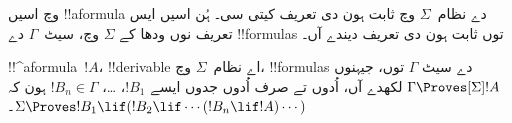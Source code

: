 \documentclass[../../../include/open-logic-section]{subfiles}
\begin{document}


 وچ اسیں !!a{formula} دے نظام~$\Sigma$ وچ ثابت ہون دی تعریف کیتی سی۔ ہُن اسیں ایس تعریف نوں ودھا کے $\Sigma$ وچ، سیٹ~$\Gamma$ دے !!{formula}s توں ثابت ہون دی تعریف دیندے آں۔

\begin{defn}
  !!^a{formula}~$!A$، !!{derivable} اے نظام~$\Sigma$ وچ، !!{formula}s دے سیٹ $\Gamma$ توں، جیہنوں $\Gamma \Proves[\Sigma] !A$ لکھدے آں، اُدوں تے صرف اُدوں جدوں ایسے $!B_1$، \dots، $!B_n \in \Gamma$ ہون کہ
  $\Sigma \Proves !B_1 \lif (!B_2 \lif \cdots (!B_n \lif !A)
  \cdots)$۔
\end{defn}
\end{document}
